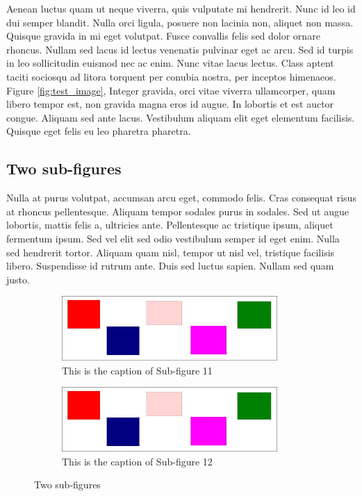 Aenean luctus quam ut neque viverra, quis vulputate mi hendrerit. Nunc id leo
id dui semper blandit. Nulla orci ligula, posuere non lacinia non, aliquet non
massa. Quisque gravida in mi eget volutpat. Fusce convallis felis sed dolor
ornare rhoncus. Nullam sed lacus id lectus venenatis pulvinar eget ac arcu. Sed
id turpis in leo sollicitudin euismod nec ac enim. Nunc vitae lacus lectus.
Class aptent taciti sociosqu ad litora torquent per conubia nostra, per
inceptos himenaeos. Figure \ref{fig:test_image}, Integer gravida, orci vitae
viverra ullamcorper, quam libero tempor est, non gravida magna eros id augue.
In lobortis et est auctor congue. Aliquam sed ante lacus. Vestibulum aliquam
elit eget elementum facilisis. Quisque eget felis eu leo pharetra pharetra.

\subsection{Two sub-figures}
Nulla at purus volutpat, accumsan arcu eget, commodo felis. Cras consequat
risus at rhoncus pellentesque. Aliquam tempor sodales purus in sodales. Sed ut
augue lobortis, mattis felis a, ultricies ante. Pellentesque ac tristique
ipsum, aliquet fermentum ipsum. Sed vel elit sed odio vestibulum semper id eget
enim. Nulla sed hendrerit tortor. Aliquam quam nisl, tempor ut nisl vel,
tristique facilisis libero. Suspendisse id rutrum ante. Duis sed luctus sapien.
Nullam sed quam justo.
\begin{figure}[h]
    \begin{subfigure}[b]{0.5\linewidth}
        \centering
            \includegraphics[width=0.9\textwidth]{figures/test_image}
            \caption{This is the caption of Sub-figure 11}
            \label{fig:subfig11}
            \end{subfigure}%
        \begin{subfigure}[b]{.5\linewidth}
            \centering
            \includegraphics[width=0.9\textwidth]{figures/test_image}
            \caption{This is the caption of Sub-figure 12}
            \label{fig:subfig12}
        \end{subfigure}
    \caption{Two sub-figures}
\label{fig:sub-figures2}
\end{figure}

